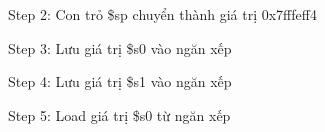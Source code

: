 \documentclass[a4paper,12pt]{article}
\begin{document}
\begin{figure}[!h]
	\centerline{}
	\caption*{Step 2: Con trỏ \$sp chuyển thành giá trị 0x7fffeff4}
	\label{fig:ass3_2}
\end{figure}
\begin{figure}[!h]
	\centerline{}
	\caption*{Step 3: Lưu giá trị \$s0 vào ngăn xếp}
	\label{fig:ass3_3}
\end{figure}
\begin{figure}[!h]
	\centerline{}
	\caption*{Step 4: Lưu giá trị \$s1 vào ngăn xếp}
	\label{fig:ass3_4}
\end{figure}
\begin{figure}[!h]
	\centerline{}
	\caption*{Step 5: Load giá trị \$s0 từ ngăn xếp}
	\label{fig:ass3_5}
\end{figure}
\end{document}
